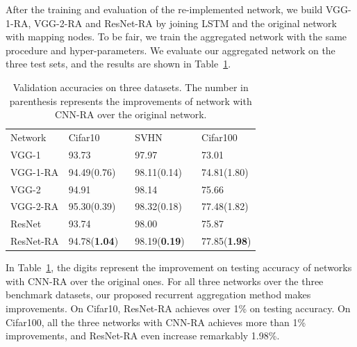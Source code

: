 \documentclass[conference]{IEEEtran}
\begin{document}
After the training and evaluation of the re-implemented network, we build VGG-1-RA, VGG-2-RA and ResNet-RA by joining LSTM and the original network with mapping nodes. To be fair, we train the aggregated network with the same procedure and hyper-parameters. We evaluate our aggregated network on the three test sets, and the results are shown in Table~\ref{table:test}.
\setlength{\tabcolsep}{4pt}
\begin{table}
\begin{center}
\caption{Validation accuracies on three datasets. The number in parenthesis represents the improvements of network with CNN-RA over the original network.}
\label{table:test}
\begin{tabular}{l|lll}
\hline\noalign{\smallskip}
Network& Cifar10 & SVHN & Cifar100\\
\noalign{\smallskip}
\hline
\noalign{\smallskip}
VGG-1 & 93.73 & 97.97 & 73.01\\
VGG-1-RA & 94.49(0.76)$\quad$ & 98.11(0.14)$\quad$ & 74.81(1.80)\\
VGG-2 & 94.91 & 98.14 & 75.66\\
VGG-2-RA & 95.30(0.39) & 98.32(0.18) & 77.48(1.82)\\
ResNet & 93.74 & 98.00 & 75.87\\
ResNet-RA & 94.78(\textbf{1.04}) & 98.19(\textbf{0.19}) & 77.85(\textbf{1.98})\\
\hline
\end{tabular}
\end{center}
\end{table}
\setlength{\tabcolsep}{1.4pt}

In Table~\ref{table:test}, the digits represent the improvement on testing accuracy of networks with CNN-RA over the original ones. For all three networks over the three benchmark datasets, our proposed recurrent aggregation method makes improvements. On Cifar10, ResNet-RA achieves over 1\% on testing accuracy. On Cifar100, all the three networks with CNN-RA achieves more than 1\% improvements, and ResNet-RA even increase remarkably 1.98\%.
\end{document}
